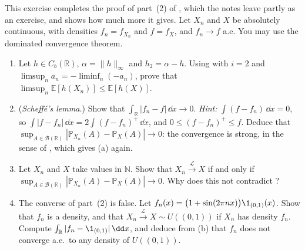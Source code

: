 
\begin{exercise}\label{ex:cl-densities}
\medium This exercise completes the proof of part~(2) of , which the
notes leave partly as an exercise, and shows how much more it gives. Let $X_n$ and $X$ be
absolutely continuous, with densities $f_n=f_{X_n}$ and $f=f_X$, and $f_n\to f$ a.e. You may use
the dominated convergence theorem.
\begin{enumerate}[label=(\alph*)]
  \item Let $h\in C_b(\mathbb R)$, $\alpha=\|h\|_\infty$ and $h_2=\alpha-h$. Using
     with $i=2$ and $\limsup_na_n=-\liminf_n(-a_n)$, prove that
    $\limsup_n\mathbb E[h(X_n)]\le\mathbb E[h(X)]$.
  \item (\emph{Scheff\'e's lemma.}) Show that $\int_{\mathbb R}|f_n-f|\,\dd x\to0$. \emph{Hint:}
    $\int(f-f_n)\,\dd x=0$, so $\int|f-f_n|\,\dd x=2\int(f-f_n)^+\,\dd x$, and
    $0\le(f-f_n)^+\le f$. Deduce that
    $\sup_{A\in\mathcal B(\mathbb R)}|\mathbb P_{X_n}(A)-\mathbb P_X(A)|\to0$: the convergence is
    strong, in the sense of , which gives (a) again.
  \item Let $X_n$ and $X$ take values in $\mathbb N$. Show that $X_n\xrightarrow{\mathcal L}X$ if
    and only if $\sup_{A\in\mathcal B(\mathbb R)}|\mathbb P_{X_n}(A)-\mathbb P_X(A)|\to0$. Why does this
    not contradict ?
  \item The converse of part~(2) is false. Let $f_n(x)=\big(1+\sin(2\pi nx)\big)\1_{(0,1)}(x)$.
    Show that $f_n$ is a density, and that $X_n\xrightarrow{\mathcal L}X\sim U((0,1))$ if $X_n$
    has density $f_n$. Compute $\int_{\mathbb R}|f_n-\1_{(0,1)}|\,\dd x$, and deduce from (b) that
    $f_n$ does not converge a.e.\ to any density of $U((0,1))$.
\end{enumerate}
\end{exercise}

